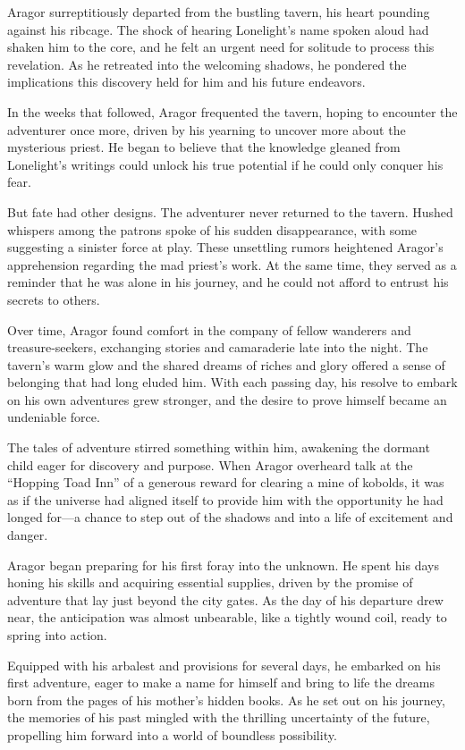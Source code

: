 Aragor surreptitiously departed from the bustling tavern, his heart pounding against his ribcage. The shock of hearing Lonelight's name spoken aloud had shaken him to the core, and he felt an urgent need for solitude to process this revelation. As he retreated into the welcoming shadows, he pondered the implications this discovery held for him and his future endeavors.

In the weeks that followed, Aragor frequented the tavern, hoping to encounter the adventurer once more, driven by his yearning to uncover more about the mysterious priest. He began to believe that the knowledge gleaned from Lonelight's writings could unlock his true potential if he could only conquer his fear.

But fate had other designs. The adventurer never returned to the tavern. Hushed whispers among the patrons spoke of his sudden disappearance, with some suggesting a sinister force at play. These unsettling rumors heightened Aragor's apprehension regarding the mad priest's work. At the same time, they served as a reminder that he was alone in his journey, and he could not afford to entrust his secrets to others.

Over time, Aragor found comfort in the company of fellow wanderers and treasure-seekers, exchanging stories and camaraderie late into the night. The tavern's warm glow and the shared dreams of riches and glory offered a sense of belonging that had long eluded him. With each passing day, his resolve to embark on his own adventures grew stronger, and the desire to prove himself became an undeniable force.

The tales of adventure stirred something within him, awakening the dormant child eager for discovery and purpose. When Aragor overheard talk at the “Hopping Toad Inn” of a generous reward for clearing a mine of kobolds, it was as if the universe had aligned itself to provide him with the opportunity he had longed for—a chance to step out of the shadows and into a life of excitement and danger.

Aragor began preparing for his first foray into the unknown. He spent his days honing his skills and acquiring essential supplies, driven by the promise of adventure that lay just beyond the city gates. As the day of his departure drew near, the anticipation was almost unbearable, like a tightly wound coil, ready to spring into action.

Equipped with his arbalest and provisions for several days, he embarked on his first adventure, eager to make a name for himself and bring to life the dreams born from the pages of his mother's hidden books. As he set out on his journey, the memories of his past mingled with the thrilling uncertainty of the future, propelling him forward into a world of boundless possibility.
